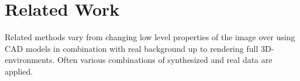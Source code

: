 




\section{Related Work}
\label{sec:training:related}

Related methods vary from changing low level properties of the image over using CAD models in combination with real background up to rendering full 3D-environments. Often various combinations of synthesized and real data are applied. 

